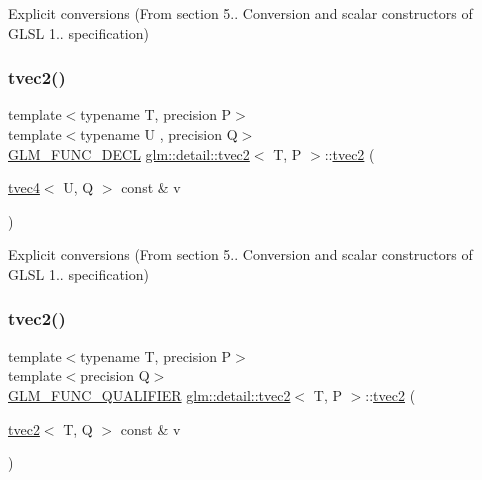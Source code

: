 Explicit conversions (From section 5.. Conversion and scalar constructors of G\+L\+SL 1.. specification) 

\mbox{\label{structglm_1_1detail_1_1tvec2_a5a2a0de134fd7f21ba208978968611b8}} 
\subsubsection{\texorpdfstring{tvec2()}{tvec2()}\hspace{0.1cm}{\footnotesize\ttfamily [10/15]}}
{\footnotesize\ttfamily template$<$typename T, precision P$>$ \\
template$<$typename U , precision Q$>$ \\
\hyperlink{setup_8hpp_ab2d052de21a70539923e9bcbf6e83a51}{G\+L\+M\+\_\+\+F\+U\+N\+C\+\_\+\+D\+E\+CL} \hyperlink{structglm_1_1detail_1_1tvec2}{glm\+::detail\+::tvec2}$<$ T, P $>$\+::\hyperlink{structglm_1_1detail_1_1tvec2}{tvec2} (\begin{DoxyParamCaption}\item[{\hyperlink{structglm_1_1detail_1_1tvec4}{tvec4}$<$ U, Q $>$ const \&}]{v }\end{DoxyParamCaption})\hspace{0.3cm}{\ttfamily [explicit]}}



Explicit conversions (From section 5.. Conversion and scalar constructors of G\+L\+SL 1.. specification) 

\mbox{\label{structglm_1_1detail_1_1tvec2_a34375ce019c83789e03dc185c9025bee}} 
\subsubsection{\texorpdfstring{tvec2()}{tvec2()}\hspace{0.1cm}{\footnotesize\ttfamily [11/15]}}
{\footnotesize\ttfamily template$<$typename T, precision P$>$ \\
template$<$precision Q$>$ \\
\hyperlink{setup_8hpp_a33fdea6f91c5f834105f7415e2a64407}{G\+L\+M\+\_\+\+F\+U\+N\+C\+\_\+\+Q\+U\+A\+L\+I\+F\+I\+ER} \hyperlink{structglm_1_1detail_1_1tvec2}{glm\+::detail\+::tvec2}$<$ T, P $>$\+::\hyperlink{structglm_1_1detail_1_1tvec2}{tvec2} (\begin{DoxyParamCaption}\item[{\hyperlink{structglm_1_1detail_1_1tvec2}{tvec2}$<$ T, Q $>$ const \&}]{v }\end{DoxyParamCaption})}



